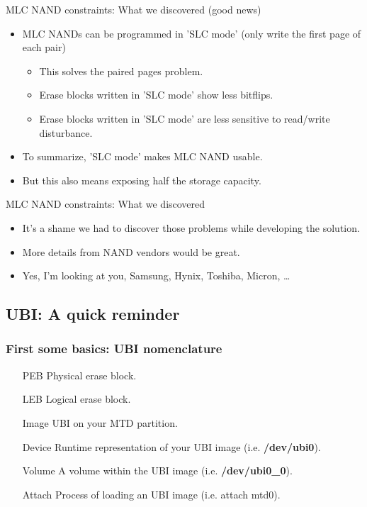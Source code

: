 \documentclass[aspectratio=169,obeyspaces,spaces,hyphens,dvipsnames]{beamer}
\begin{document}
\begin{frame}{MLC NAND constraints: What we discovered (good news)}
  \begin{itemize}
  \item MLC NANDs can be programmed in 'SLC mode' (only write the first
	page of each pair)
    \begin{itemize}
    \item This solves the paired pages problem.
    \item Erase blocks written in 'SLC mode' show less bitflips.
    \item Erase blocks written in 'SLC mode' are less sensitive to
	  read/write disturbance.
    \end{itemize}
  \item To summarize, 'SLC mode' makes MLC NAND usable.
  \item But this also means exposing half the storage capacity.
  \end{itemize}
\end{frame}

\begin{frame}{MLC NAND constraints: What we discovered}
  \begin{itemize}
  \item It's a shame we had to discover those problems while developing
	the solution.
  \item More details from NAND vendors would be great.
  \item Yes, I'm looking at you, Samsung, Hynix, Toshiba, Micron, \ldots
  \end{itemize}
\end{frame}

\subsection{UBI: A quick reminder}

\begin{frame}[fragile]
\frametitle{First some basics: UBI nomenclature}
  \begin{itemize}
  \item[PEB] Physical erase block.
  \item[LEB] Logical erase block.
  \item[Image] UBI on your MTD partition.
  \item[Device] Runtime representation of your UBI image (i.e. \textbf{/dev/ubi0}).
  \item[Volume] A volume within the UBI image (i.e. \textbf{/dev/ubi0\_0}).
  \item[Attach] Process of loading an UBI image (i.e. attach mtd0).
  \end{itemize}
\end{frame}
\end{document}
